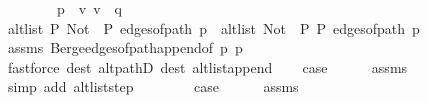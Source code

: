 \begin{isabellebody}
\ \ \isamarkupfalse%
\ {}\isanewline
\ \ \isamarkupfalse%
\ {\isacharquery}{\kern0pt}p{\isacharprime}{\kern0pt}\ {\isacharequal}{\kern0pt}\ {\isachardoublequoteopen}{\isacharbrackleft}{\kern0pt}v{\isacharcomma}{\kern0pt}\ v{\isacharprime}{\kern0pt}{\isacharbrackright}{\kern0pt}\ {\isacharat}{\kern0pt}\ q{\isachardoublequoteclose}\isanewline
\ \ \isamarkupfalse%
\ {\isachardoublequoteopen}alt{\isacharunderscore}{\kern0pt}list\ P\ {\isacharparenleft}{\kern0pt}Not\ {\isasymcirc}\ P{\isacharparenright}{\kern0pt}\ {\isacharparenleft}{\kern0pt}edges{\isacharunderscore}{\kern0pt}of{\isacharunderscore}{\kern0pt}path\ {\isacharquery}{\kern0pt}p{\isacharprime}{\kern0pt}{\isacharparenright}{\kern0pt}\ {\isasymor}\ alt{\isacharunderscore}{\kern0pt}list\ {\isacharparenleft}{\kern0pt}Not\ {\isasymcirc}\ P{\isacharparenright}{\kern0pt}\ P\ {\isacharparenleft}{\kern0pt}edges{\isacharunderscore}{\kern0pt}of{\isacharunderscore}{\kern0pt}path\ {\isacharquery}{\kern0pt}p{\isacharprime}{\kern0pt}{\isacharparenright}{\kern0pt}{\isachardoublequoteclose}\isanewline
\ \ \ \ \isamarkupfalse%
\ assms{\isacharparenleft}{\kern0pt}{}{\isacharparenright}{\kern0pt}\ Berge{\isachardot}{\kern0pt}edges{\isacharunderscore}{\kern0pt}of{\isacharunderscore}{\kern0pt}path{\isacharunderscore}{\kern0pt}append{\isacharbrackleft}{\kern0pt}of\ p\ {\isacharquery}{\kern0pt}p{\isacharprime}{\kern0pt}{\isacharbrackright}{\kern0pt}\isanewline
\ \ \ \ \isamarkupfalse%
\ {\isacharparenleft}{\kern0pt}fastforce\ dest{\isacharcolon}{\kern0pt}\ alt{\isacharunderscore}{\kern0pt}pathD{\isacharparenleft}{\kern0pt}{}{\isacharparenright}{\kern0pt}\ dest{\isacharcolon}{\kern0pt}\ alt{\isacharunderscore}{\kern0pt}list{\isacharunderscore}{\kern0pt}append{\isacharunderscore}{\kern0pt}{}{\isacharparenright}{\kern0pt}\isanewline
\ \ \isamarkupfalse%
\ {\isacharquery}{\kern0pt}case\isanewline
\ \ \ \ \isamarkupfalse%
\ assms{\isacharparenleft}{\kern0pt}{}{\isacharparenright}{\kern0pt}\isanewline
\ \ \ \ \isamarkupfalse%
\ {\isacharparenleft}{\kern0pt}simp\ add{\isacharcolon}{\kern0pt}\ alt{\isacharunderscore}{\kern0pt}list{\isacharunderscore}{\kern0pt}step{\isacharparenright}{\kern0pt}\isanewline
{}\isamarkupfalse%
\isanewline
\ \ \isamarkupfalse%
\ {}\isanewline
\ \ \isamarkupfalse%
\ {\isacharquery}{\kern0pt}case\isanewline
\ \ \ \ \isamarkupfalse%
\ assms{\isacharparenleft}{\kern0pt}{}{\isacharparenright}{\kern0pt}\isanewline

\end{isabellebody}
